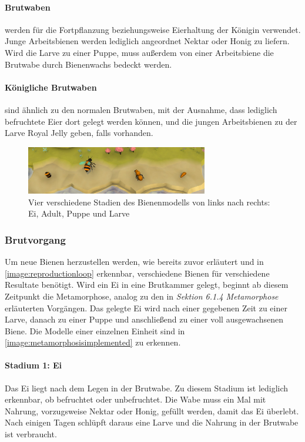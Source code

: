 \paragraph{Brutwaben} werden für die Fortpflanzung beziehungsweise Eierhaltung der Königin verwendet. Junge Arbeitsbienen werden lediglich angeordnet Nektar oder Honig zu liefern. Wird die Larve zu einer Puppe, muss außerdem von einer Arbeitsbiene die Brutwabe durch Bienenwachs bedeckt werden.

\paragraph{Königliche Brutwaben} sind ähnlich zu den normalen Brutwaben, mit der Ausnahme, dass lediglich befruchtete Eier dort gelegt werden können, und die jungen Arbeitsbienen zu der Larve Royal Jelly geben, falls vorhanden.

\begin{figure}
    \begin{center}
        \includegraphics[width=300px]{0.bilder/metamorphosisimplemented.jpg}
    \end{center}
    \caption{Vier verschiedene Stadien des Bienenmodells von links nach rechts: Ei, Adult, Puppe und Larve} \label{image:metamorphosisimplemented}
\end{figure}

\subsubsection{Brutvorgang}
Um neue Bienen herzustellen werden, wie bereits zuvor erläutert und in \autoref{image:reproductionloop} erkennbar, verschiedene Bienen für verschiedene Resultate benötigt. Wird ein Ei in eine Brutkammer gelegt, beginnt ab diesem Zeitpunkt die Metamorphose, analog zu den in \textit{Sektion 6.1.4 Metamorphose} erläuterten Vorgängen. Das gelegte Ei wird nach einer gegebenen Zeit zu einer Larve, danach zu einer Puppe und anschließend zu einer voll ausgewachsenen Biene. Die Modelle einer einzelnen Einheit sind in \autoref{image:metamorphosisimplemented} zu erkennen.

\paragraph{Stadium 1: Ei} Das Ei liegt nach dem Legen in der Brutwabe. Zu diesem Stadium ist lediglich erkennbar, ob befruchtet oder unbefruchtet. Die Wabe muss ein Mal mit Nahrung, vorzugsweise Nektar oder Honig, gefüllt werden, damit das Ei überlebt. Nach einigen Tagen schlüpft daraus eine Larve und die Nahrung in der Brutwabe ist verbraucht.

